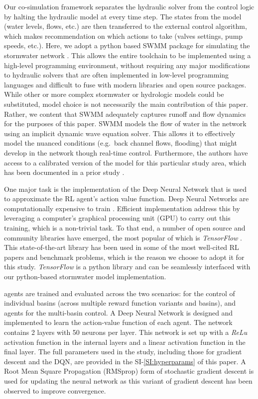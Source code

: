 Our co-simulation framework separates the hydraulic solver from the control logic by halting the hydraulic model at every time step.
The states from the model (water levels, flows, etc.) are then transferred to the external control algorithm, which makes recommendation on which actions to take (valves settings, pump speeds, etc.).
Here, we adopt a python based SWMM package for simulating the stormwater network \cite{Riano-Briceno2016MatSWMMSystems}.
This allows the entire toolchain to be implemented using a high-level programming environment, without requiring any major modifications to hydraulic solvers that are often implemented in low-level programming languages and difficult to fuse with modern libraries and open source packages.
While other or more complex stormwater or hydrologic models could be substituted, model choice is not necessarily the main contribution of this paper.
Rather, we content that SWMM adequately captures runoff and flow dynamics for the purposes of this paper.
SWMM models the flow of water in the network using an implicit dynamic wave equation solver\cite{Rossman2010Storm5.1}.
This allows it to effectively model the nuanced conditions (e.g.\ back channel flows, flooding) that might develop in the network though real-time control.
Furthermore, the authors have access to a calibrated version of the model for this particular study area, which has been documented in a prior study \cite{aaswmm,wong2018real}.

One major task is the implementation of the Deep Neural Network that is used to approximate the RL agent’s action value function.
Deep Neural Networks are computationally expensive to train \cite{lecun2015Deep}.
Efficient implementation address this by leveraging a computer's graphical processing unit (GPU) to carry out this training, which is a non-trivial task.
To that end, a number of open source and community libraries have emerged, the most popular of which is \textit{TensorFlow} \cite{AbadiThisLearning}.
This state-of-the-art library has been used in some of the most well-cited RL papers and benchmark problems, which is the reason we choose to adopt it for this study.
\textit{TensorFlow} is a python library and can be seamlessly interfaced with our python-based stormwater model implementation.

 agents are trained and evaluated across the two scenarios:  for the control of individual basins (across multiple reward function variants and basins), and  agents for the multi-basin control.
A Deep Neural Network is designed and implemented to learn the action-value function of each agent.
The network contains 2 layers with 50 neurons per layer.
This network is set up with a \textit{ReLu} activation function \cite{goodfellow2016Deep} in the internal layers and a linear activation function in the final layer.
The full parameters used in the study, including those for gradient descent and the DQN, are provided in the SI-\ref{SI:hyperparams} of this paper.
A Root Mean Square Propagation (RMSprop) \cite{goodfellow2016Deep} form of stochastic gradient descent is used for updating the neural network as this variant of gradient descent has been observed to improve convergence.


